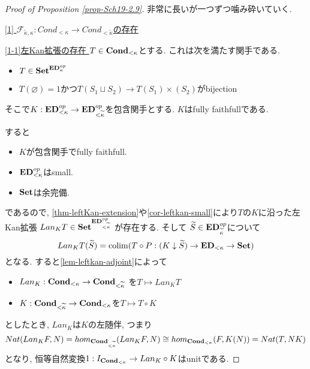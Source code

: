 \documentclass[dvipdfmx,a4paper,11pt]{article}
\newcommand{\colim}{{\rm colim}}
\theoremstyle{definition}
\begin{document}
\begin{proof}[Proof of Proposition \ref{prop-Sch19-2.9}]
非常に長いが一つずつ噛み砕いていく. 

\underline{[1] $\mathcal{F}_{\widetilde{\kappa}, \kappa} :  Cond_{<\kappa} \to Cond_{<\widetilde{\kappa}}$の存在} 

\underline{[1-1]左Kan拡張の存在 }$T \in {\bf Cond_{<\kappa}}$とする.
これは次を満たす関手である.
\begin{itemize}
\item $T \in {\bf Set}^{{\bf ED}_{\kappa}^{op}}$
\item $T(\varnothing)=1$かつ$T(S_1 \sqcup S_2) \to T(S_1) \times (S_2)$がbijection
\end{itemize}
そこで$K : {\bf ED}_{<\kappa}^{op} \to {\bf ED}_{<\widetilde{\kappa}}^{op}$を包含関手とする. 
$K$はfully faithfullである.

すると
\begin{itemize}
\item $K$が包含関手でfully faithfull.
\item ${\bf ED}_{<\kappa}^{op}$はsmall.
\item ${\bf Set }$は余完備.
\end{itemize}
であるので, \ref{thm-leftKan-extension}や\ref{cor-leftkan-small}により$T$の$K$に沿った左Kan拡張
$Lan_{K}T \in {\bf Set}^{{\bf ED}_{<\widetilde{\kappa}}^{op}}$
が存在する. そして
$\widetilde{S} \in {\bf ED}_{\widetilde{\kappa}}^{op}$について
$$
Lan_{K}T(\widetilde{S}) = \colim(T \circ P : (K \downarrow \widetilde{S}) \to {\bf ED}_{<\kappa} \to {\bf Set})
$$
となる.
すると\ref{lem-leftkan-adjoint}によって
\begin{itemize}
\item $Lan_{K} : {\bf  Cond_{<\kappa}} \to { \bf Cond_{<\widetilde{\kappa}} }$ を$T \mapsto Lan_{K}T$
\item $K : {\bf Cond_{<\widetilde{\kappa}} }\to {\bf Cond_{< \kappa}} $を$T \mapsto T \circ K$
\end{itemize}
としたとき, 
$Lan_{K}$は$K$の左随伴, つまり
$$
Nat(Lan_{K}F, N)
=
hom_{{\bf Cond_{<\widetilde{\kappa}}} }(Lan_{K}F, N)
 \cong
 hom_{{\bf Cond_{< \kappa}}}(F, K(N)) 
 = Nat(T,NK)
$$
となり, 恒等自然変換$1:  I_{{\bf Cond_{<\kappa}}}\to Lan_{K} \circ K$はunitである. 


\end{proof}
\end{document}
